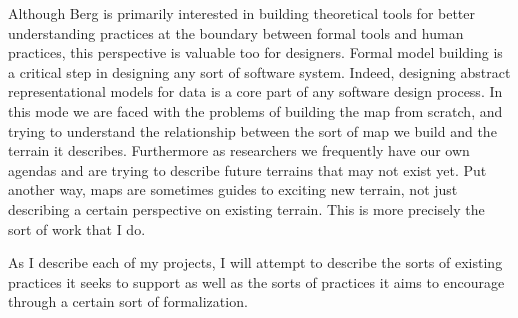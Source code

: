 Although Berg is primarily interested in building theoretical tools for better understanding practices at the boundary between formal tools and human practices, this perspective is valuable too for designers. Formal model building is a critical step in designing any sort of software system. Indeed, designing abstract representational models for data is a core part of any software design process.  In this mode we are faced with the problems of building the map from scratch, and trying to understand the relationship between the sort of map we build and the terrain it describes. Furthermore as researchers we frequently have our own agendas and are trying to describe future terrains that may not exist yet. Put another way, maps are sometimes guides to exciting new terrain, not just describing a certain perspective on existing terrain. This is more precisely the sort of work that I do.

As I describe each of my projects, I will attempt to describe the sorts of existing practices it seeks to support as well as the sorts of practices it aims to encourage through a certain sort of formalization. 







% 
% 
